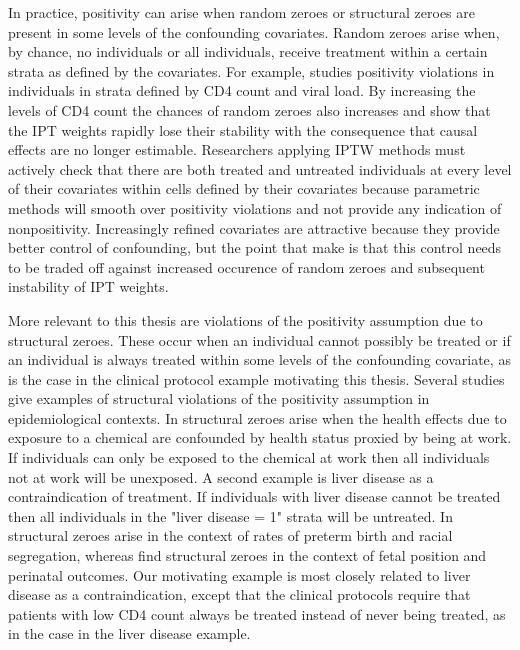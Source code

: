 \documentclass[11pt]{article}
\begin{document}
In practice, positivity can arise when random zeroes or structural
zeroes are present in some levels of the confounding covariates. Random
zeroes arise when, by chance, no individuals or all individuals, receive
treatment within a certain strata as defined by the covariates. For
example, \citet{Cole2008} studies positivity violations in individuals
in strata defined by CD4 count and viral load. By increasing the levels
of CD4 count the chances of random zeroes also increases and
\citet{Cole2008} show that the IPT weights rapidly lose their stability
with the consequence that causal effects are no longer estimable.
Researchers applying IPTW methods must actively check that there are
both treated and untreated individuals at every level of their
covariates within cells defined by their covariates because parametric
methods will smooth over positivity violations and not provide any
indication of nonpositivity. Increasingly refined covariates are
attractive because they provide better control of confounding, but the
point that \citet{Cole2008} make is that this control needs to be traded
off against increased occurence of random zeroes and subsequent
instability of IPT weights. \linebreak

More relevant to this thesis are violations of the positivity assumption
due to structural zeroes. These occur when an individual cannot possibly
be treated or if an individual is always treated within some levels of
the confounding covariate, as is the case in the clinical protocol
example motivating this thesis. Several studies give examples of
structural violations of the positivity assumption in epidemiological
contexts. In \citet{Cole2008} structural zeroes arise when the health
effects due to exposure to a chemical are confounded by health status
proxied by being at work. If individuals can only be exposed to the
chemical at work then all individuals not at work will be unexposed. A
second example is liver disease as a contraindication of treatment. If
individuals with liver disease cannot be treated then all individuals in
the "liver disease = 1" strata will be untreated. In \citet{Messer2010}
structural zeroes arise in the context of rates of preterm birth and
racial segregation, whereas \citet{Cheng2010} find structural zeroes in
the context of fetal position and perinatal outcomes. Our motivating
example is most closely related to liver disease as a contraindication,
except that the clinical protocols require that patients with low CD4
count always be treated instead of never being treated, as in the case
in the liver disease example. \linebreak
\end{document}
